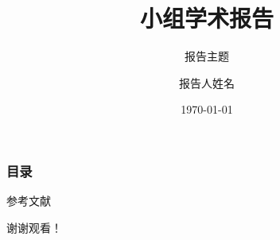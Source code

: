 \documentclass{beamer}
\title{小组学术报告}
\subtitle{报告主题}
\author{报告人姓名}
\institute{所在单位}
\date{\today}
\begin{document}
\frame{\titlepage}

\begin{frame}
    \frametitle{目录}
    \tableofcontents
\end{frame}






\begin{frame}[allowframebreaks]{参考文献}
	\small		
	\printbibliography
\end{frame}

\begin{frame}
    \centering
    \Huge

    谢谢观看！
\end{frame}
\end{document}
